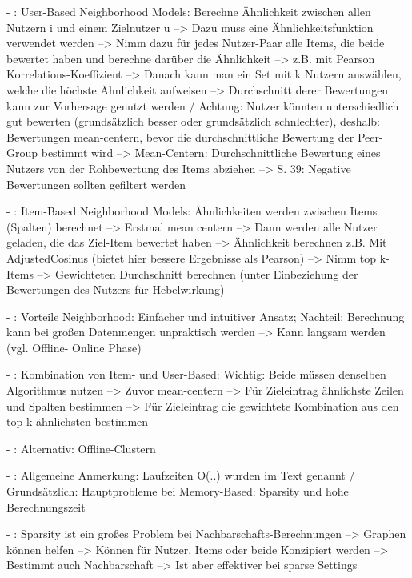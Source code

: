 - \cite[S. 34f.]{recommenderSystems:2016}: User-Based Neighborhood Models: Berechne Ähnlichkeit zwischen allen Nutzern i und einem Zielnutzer u --> Dazu muss eine Ähnlichkeitsfunktion verwendet werden --> Nimm dazu für jedes Nutzer-Paar alle Items, die beide bewertet haben und berechne darüber die Ähnlichkeit --> z.B. mit Pearson Korrelations-Koeffizient --> Danach kann man ein Set mit k Nutzern auswählen, welche die höchste Ähnlichkeit aufweisen --> Durchschnitt derer Bewertungen kann zur Vorhersage genutzt werden / Achtung: Nutzer könnten unterschiedlich gut bewerten (grundsätzlich besser oder grundsätzlich schnlechter), deshalb: Bewertungen mean-centern, bevor die durchschnittliche Bewertung der Peer-Group bestimmt wird --> Mean-Centern: Durchschnittliche Bewertung eines Nutzers von der Rohbewertung des Items abziehen --> S. 39: Negative Bewertungen sollten gefiltert werden

- \cite[S. 40f.]{recommenderSystems:2016}: Item-Based Neighborhood Models: Ähnlichkeiten werden zwischen Items (Spalten) berechnet --> Erstmal mean centern --> Dann werden alle Nutzer geladen, die das Ziel-Item bewertet haben --> Ähnlichkeit berechnen z.B. Mit AdjustedCosinus (bietet hier bessere Ergebnisse als Pearson) --> Nimm top k-Items --> Gewichteten Durchschnitt berechnen (unter Einbeziehung der Bewertungen des Nutzers für Hebelwirkung)

- \cite[S. 44]{recommenderSystems:2016}: Vorteile Neighborhood: Einfacher und intuitiver Ansatz; Nachteil: Berechnung kann bei großen Datenmengen unpraktisch werden --> Kann langsam werden (vgl. Offline- Online Phase)

- \cite[S. 44]{recommenderSystems:2016}: Kombination von Item- und User-Based: Wichtig: Beide müssen denselben Algorithmus nutzen --> Zuvor mean-centern --> Für Zieleintrag ähnlichste Zeilen und Spalten bestimmen --> Für Zieleintrag die gewichtete Kombination aus den top-k ähnlichsten bestimmen

- \cite[S. 46]{recommenderSystems:2016}: Alternativ: Offline-Clustern

- \cite{recommenderSystems:2016}: Allgemeine Anmerkung: Laufzeiten O(..) wurden im Text genannt / Grundsätzlich: Hauptprobleme bei Memory-Based: Sparsity und hohe Berechnungszeit

- \cite[S. 60]{recommenderSystems:2016}: Sparsity ist ein großes Problem bei Nachbarschafts-Berechnungen  --> Graphen können helfen --> Können für Nutzer, Items oder beide Konzipiert werden --> Bestimmt auch Nachbarschaft --> Ist aber effektiver bei sparse Settings


